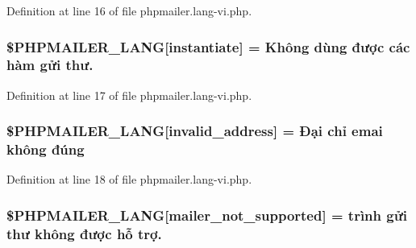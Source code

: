 Definition at line 16 of file phpmailer.\+lang-\/vi.\+php.

\subsubsection[{\texorpdfstring{\$\+P\+H\+P\+M\+A\+I\+L\+E\+R\+\_\+\+L\+A\+NG}{$PHPMAILER_LANG}}]{\setlength{\rightskip}{0pt plus 5cm}\$P\+H\+P\+M\+A\+I\+L\+E\+R\+\_\+\+L\+A\+NG\mbox{[}\textquotesingle{}instantiate\textquotesingle{}\mbox{]} = \textquotesingle{}Không dùng được các hàm gửi thư.\textquotesingle{}}\hypertarget{phpmailer_8lang-vi_8php_ad58dde16780f4770ccf4dd282ea1f5ad}{}\label{phpmailer_8lang-vi_8php_ad58dde16780f4770ccf4dd282ea1f5ad}


Definition at line 17 of file phpmailer.\+lang-\/vi.\+php.

\subsubsection[{\texorpdfstring{\$\+P\+H\+P\+M\+A\+I\+L\+E\+R\+\_\+\+L\+A\+NG}{$PHPMAILER_LANG}}]{\setlength{\rightskip}{0pt plus 5cm}\$P\+H\+P\+M\+A\+I\+L\+E\+R\+\_\+\+L\+A\+NG\mbox{[}\textquotesingle{}invalid\+\_\+address\textquotesingle{}\mbox{]} = \textquotesingle{}Đại chỉ emai không đúng\textquotesingle{}}\hypertarget{phpmailer_8lang-vi_8php_a42d61bcea4c79599ecb44fd062f54d47}{}\label{phpmailer_8lang-vi_8php_a42d61bcea4c79599ecb44fd062f54d47}


Definition at line 18 of file phpmailer.\+lang-\/vi.\+php.

\subsubsection[{\texorpdfstring{\$\+P\+H\+P\+M\+A\+I\+L\+E\+R\+\_\+\+L\+A\+NG}{$PHPMAILER_LANG}}]{\setlength{\rightskip}{0pt plus 5cm}\$P\+H\+P\+M\+A\+I\+L\+E\+R\+\_\+\+L\+A\+NG\mbox{[}\textquotesingle{}mailer\+\_\+not\+\_\+supported\textquotesingle{}\mbox{]} = \textquotesingle{} trình gửi thư không được hỗ trợ.\textquotesingle{}}\hypertarget{phpmailer_8lang-vi_8php_aa2ebcb8833ee83a7ad67401c4bb3a6ad}{}\label{phpmailer_8lang-vi_8php_aa2ebcb8833ee83a7ad67401c4bb3a6ad}


